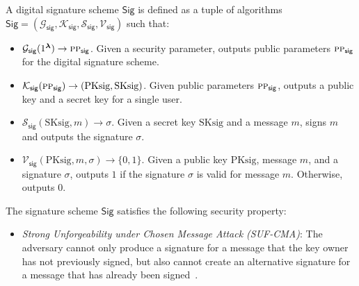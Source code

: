 \begin{definition}
	\label{def:Strongly-unforgeable digital signature}
	
	A digital signature scheme $\mathsf{Sig}$ is defined as a tuple of algorithms $\mathsf{Sig}=(\mathcal{G}_\mathsf{sig}, \mathcal{K}_\mathsf{sig}, \mathcal{S}_\mathsf{sig}, \mathcal{V}_\mathsf{sig})$ such that:
	\begin{itemize}
		\item $\mathcal{G}_\mathsf{sig}(1^{\boldsymbol{\lambda}}) \rightarrow \textsc{pp}_\mathsf{sig}$. Given a security parameter, outputs public parameters $\textsc{pp}_\mathsf{sig}$ for the digital signature scheme.
		\item $\mathcal{K}_\mathsf{sig}(\textsc{pp}_\mathsf{sig}) \rightarrow (\text{PKsig}, \text{SKsig})$. Given public parameters $\textsc{pp}_\mathsf{sig}$, outputs a public key and a secret key for a single user.
		\item $\mathcal{S}_\mathsf{sig}(\text{SKsig}, m) \rightarrow \sigma$. Given a secret key $\text{SKsig}$ and a message $m$, signs $m$ and outputs the signature $\sigma$.
		\item $\mathcal{V}_\mathsf{sig}(\text{PKsig}, m, \sigma) \rightarrow \{0, 1\}$. Given a public key $\text{PKsig}$, message $m$, and a signature $\sigma$, outputs $1$ if the signature $\sigma$ is valid for message $m$. Otherwise, outputs $0$.
	\end{itemize}
	The signature scheme $\mathsf{Sig}$ satisfies the following security property:
	\begin{itemize}
		\item \textit{Strong Unforgeability under Chosen Message Attack (SUF-CMA)}: The adversary cannot only produce a signature for a message that the key owner has not previously signed, but also cannot create an alternative signature for a message that has already been signed~\cite{Brendel2021TheProvableSecurity}.
	\end{itemize}
\end{definition}


	
